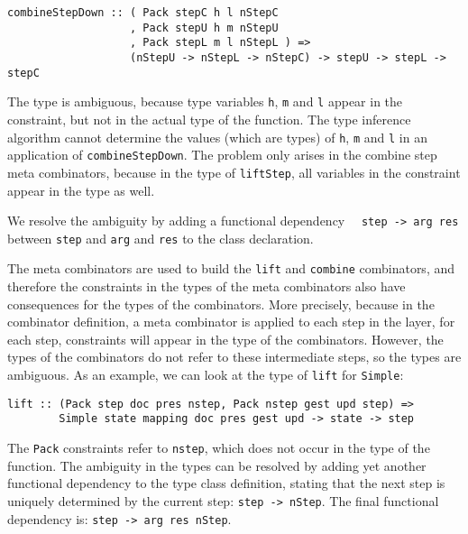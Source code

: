 \begin{small}
\begin{verbatim}
combineStepDown :: ( Pack stepC h l nStepC 
                   , Pack stepU h m nStepU
                   , Pack stepL m l nStepL ) => 
                   (nStepU -> nStepL -> nStepC) -> stepU -> stepL -> stepC
\end{verbatim}
\end{small}

The type is ambiguous, because type variables \texttt{h}, \texttt{m} and \texttt{l} appear in the constraint, but not in the actual type of the function. The type inference algorithm cannot determine the values (which are types) of \texttt{h}, \texttt{m} and \texttt{l} in an application of \texttt{combineStepDown}. The problem only arises in the combine step meta combinators, because in the type of \texttt{liftStep}, all variables in the constraint appear in the type as well.

We resolve the ambiguity by adding a functional dependency~\cite{fundep}~ \texttt{step -> arg res} between \texttt{step} and \texttt{arg} and \texttt{res} to the class declaration.

The meta combinators are used to build the \texttt{lift} and \texttt{combine} combinators, and therefore the constraints in the types of the meta combinators also have consequences for the types of the combinators. More precisely, because in the combinator definition, a meta combinator is applied to each step in the layer, for each step, constraints will appear in the type of the combinators. However, the types of the combinators do not refer to these intermediate steps, so the types are ambiguous. As an example, we can look at the type of \texttt{lift} for \texttt{Simple}:

\begin{small}
\begin{verbatim}
lift :: (Pack step doc pres nstep, Pack nstep gest upd step) =>
        Simple state mapping doc pres gest upd -> state -> step
\end{verbatim}
\end{small}

The \texttt{Pack} constraints refer to \texttt{nstep}, which does not occur in the type of the function. The ambiguity in the types can be resolved by adding yet another functional dependency to the type class definition, stating that the next step is uniquely determined by the current step: \texttt{step -> nStep}. The final functional dependency is: \texttt{step -> arg res nStep}. 

